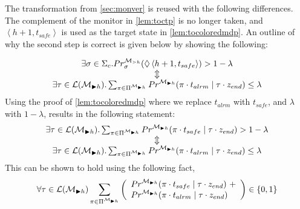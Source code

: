 \documentclass[runningheads]{llncs}
\newcommand{\talrm}{t_{alrm}}
\newcommand{\tsafe}{t_{safe}}
\newcommand{\en}{z_{\color{black} end}\xspace}
\newcommand{\safes}[1][h+1]{\left\langle #1, \tsafe\right\rangle}
\newcommand{\ccSched}{\Sigma_c}
\begin{document}
\nfa*
\begin{proofoutline}
    The transformation from \cref{sec:monver} is reused with the following differences. The complement of the monitor in \cref{lem:toctp} is no longer taken, and $\safes$ is used as the target state in \cref{lem:tocoloredmdp}. An outline of why the second step is correct is given below by showing the following:

    \[
        \begin{array}{c}
            \exists \sigma \in \ccSched.  \Prob^{\mdp_{\gtrdot h}}_{\sigma}(\lozenge \safes) > 1 - \lambda \\
            \Updownarrow                                                                                   \\
            \exists \tau \in \lang{\mc_{\blacktriangleright h}}. \sum_{\pi\in\Pi^{\mc_{\blacktriangleright h}}}\Prob^{\mc_{\blacktriangleright h}}(\pi \cdot \talrm \mid \tau \cdot \en) \leq \lambda
        \end{array}
    \]
    Using the proof of \cref{lem:tocoloredmdp} where we replace $\talrm$ with $\tsafe$, and $\lambda$ with $1 - \lambda$, results in the following statement:
    \[
        \begin{array}{c}
            \exists \tau \in \lang{\mc_{\blacktriangleright h}}. \sum_{\pi\in\Pi^{\mc_{\blacktriangleright h}}}\Prob^{\mc_{\blacktriangleright h}}(\pi \cdot \tsafe \mid \tau \cdot \en) > 1 - \lambda \\
            \Updownarrow                                                                                                                                                                               \\
            \exists \tau \in \lang{\mc_{\blacktriangleright h}}. \sum_{\pi\in\Pi^{\mc_{\blacktriangleright h}}}\Prob^{\mc_{\blacktriangleright h}}(\pi \cdot \talrm \mid \tau \cdot \en) \leq \lambda
        \end{array}
    \]
    This can be shown to hold using the following fact,
    \begin{align*}
        \forall\tau \in \lang{\mc_{\blacktriangleright h}} \sum_{\pi\in\Pi^{\mc_{\blacktriangleright h}}}
        \left(
        \begin{array}{l}
                \Prob^{\mc_{\blacktriangleright h}}(\pi \cdot \tsafe \mid \tau \cdot \en)\ + \\
                \Prob^{\mc_{\blacktriangleright h}}(\pi \cdot \talrm \mid \tau \cdot \en)
            \end{array}
        \right)
        \in \{0,1\}
    \end{align*}
\end{proofoutline}
\end{document}

